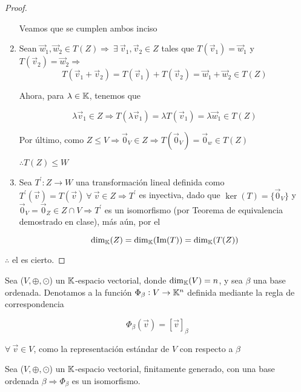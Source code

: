 \begin{proof}
\begin{enumerate}
Veamos que se cumplen ambos inciso
    \item Sean $\vec{w}_1,\vec{w}_2 \in T(Z) \Rightarrow \: \exists \: \vec{v}_1,\vec{v}_2 \in Z$ tales que $T(\vec{v}_1)=\vec{w}_1 $ y $ T(\vec{v}_2)=\vec{w}_2 \Rightarrow$
    $$T(\vec{v}_1+\vec{v}_2)=T(\vec{v}_1)+T(\vec{v}_2)=\vec{w}_1+\vec{w}_2 \in T(Z)$$

    Ahora, para $\lambda \in \mathbb{K}$, tenemos que

    $$\lambda \vec{v}_1 \in Z \Rightarrow T(\lambda \vec{v}_1)=\lambda T(\vec{v}_1)=\lambda \vec{w}_1 \in T(Z)$$

    Por último, como $Z \leq V \Rightarrow \vec{0}_V \in Z \Rightarrow T(\vec{0}_V)=\vec{0}_w \in T(Z) $ 
    
    $\therefore T(Z) \leq W$

    \item Sea ${T}^{\prime}:Z \to W$ una transformación lineal definida como ${T}^{\prime}(\vec{v})=T(\vec{v}) \: \forall \: \vec{v} \in Z \Rightarrow {T}^{\prime}$ es inyectiva, dado que $\ker(T)=\{\vec{0}_V\} $ y $ \vec{0}_V=\vec{0}_{Z} \in Z \cap V \Rightarrow {T}^{\prime}$ es un isomorfismo (por Teorema de equivalencia demostrado en clase), más aún, por el  
    
    $$\dim_{\mathbb{K}}(Z)=\dim_{\mathbb{K}}(\Im(T))=\dim_{\mathbb{K}}(T(Z))$$
\end{enumerate}
 $\therefore$ el  es cierto.
 \end{proof}

\begin{definition} 
    Sea ($V, \oplus, \odot$) un $\mathbb{K}$-espacio vectorial, donde $\dim_{\mathbb{K}}(V)=n$, y sea $\beta$ una base ordenada. Denotamos a la función $\Phi_{\beta}:V\to \mathbb{K}^n$ definida mediante la regla de correspondencia 
    
    $$\Phi_{\beta}(\vec{v})=[\vec{v}]_{\beta} $$
    
    $ \forall \: \vec{v} \in V$, como la representación estándar de $V$ con respecto a $\beta$
\end{definition}

\begin{theorem}
    Sea ($V, \oplus, \odot$) un $\mathbb{K}$-espacio vectorial, finitamente generado, con una base ordenada $\beta \Rightarrow \Phi_{\beta}$ es un isomorfismo. 
\end{theorem}

